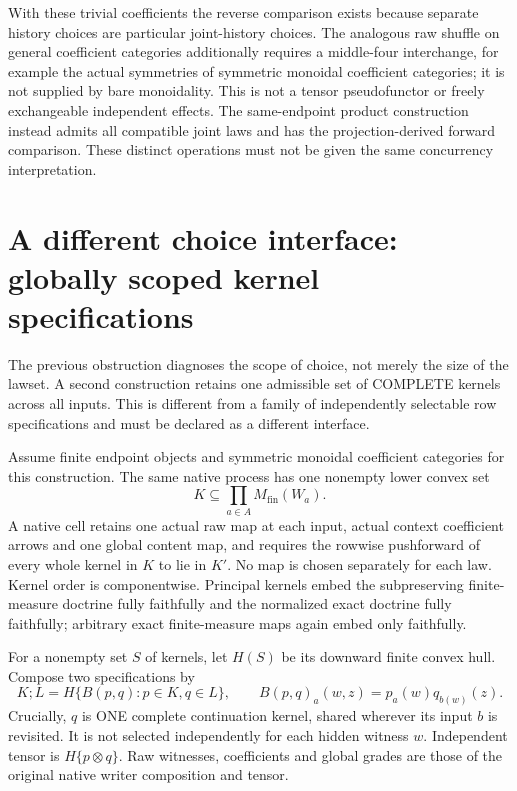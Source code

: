 \documentclass{article}
\begin{document}
With these trivial coefficients the reverse comparison exists because separate history choices are particular joint-history choices. The analogous raw shuffle on general coefficient categories additionally requires a middle-four interchange, for example the actual symmetries of symmetric monoidal coefficient categories; it is not supplied by bare monoidality. This is not a tensor pseudofunctor or freely exchangeable independent effects. The same-endpoint product construction instead admits all compatible joint laws and has the projection-derived forward comparison. These distinct operations must not be given the same concurrency interpretation.
\section{A different choice interface: globally scoped kernel specifications}
The previous obstruction diagnoses the scope of choice, not merely the size of the lawset. A second construction retains one admissible set of COMPLETE kernels across all inputs. This is different from a family of independently selectable row specifications and must be declared as a different interface.

Assume finite endpoint objects and symmetric monoidal coefficient categories for this construction. The same native process has one nonempty lower convex set
\[K\subseteq\prod_{a\in A}M_{\mathrm{fin}}(W_a).\]
A native cell retains one actual raw map at each input, actual context coefficient arrows and one global content map, and requires the rowwise pushforward of every whole kernel in $K$ to lie in $K'$. No map is chosen separately for each law. Kernel order is componentwise. Principal kernels embed the subpreserving finite-measure doctrine fully faithfully and the normalized exact doctrine fully faithfully; arbitrary exact finite-measure maps again embed only faithfully.

For a nonempty set $S$ of kernels, let $H(S)$ be its downward finite convex hull. Compose two specifications by
\[K;L=H\{B(p,q):p\in K,q\in L\},\qquad
 B(p,q)_a(w,z)=p_a(w)q_{b(w)}(z).
\]
Crucially, $q$ is ONE complete continuation kernel, shared wherever its input $b$ is revisited. It is not selected independently for each hidden witness $w$. Independent tensor is $H\{p\otimes q\}$. Raw witnesses, coefficients and global grades are those of the original native writer composition and tensor.
\end{document}
